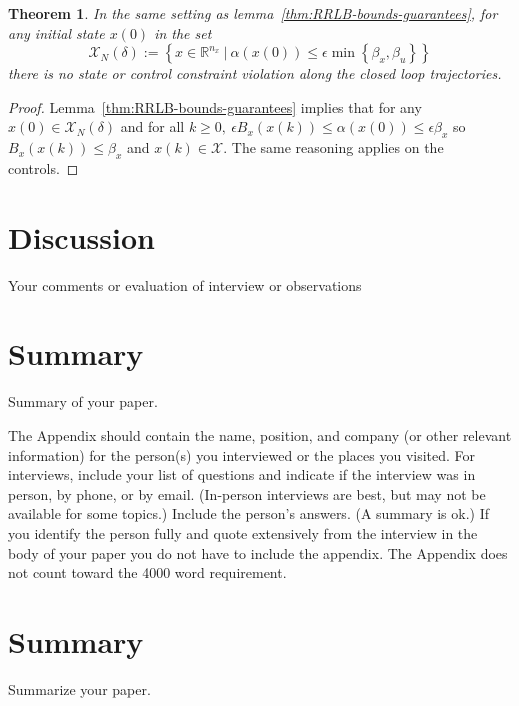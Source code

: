 \documentclass[journal]{IEEEtran}
\newtheorem{theorem}{Theorem}[section]
\theoremstyle{definition}
\theoremstyle{remark}
\def\cal#1{\mathcal{#1}}
\newcommand{\R}{\mathbb{R}}
\begin{document}
\begin{theorem}
	In the same setting as lemma~\ref{thm:RRLB-bounds-guarantees}, for any initial state $x(0)$ in the set
	$$\cal{X}_N(\delta):=\left\{x\in\R^{n_x}~|~\alpha(x(0))\leq\epsilon\min\left\{\beta_x,\beta_u\right\}\right\}$$
	there is no state or control constraint violation along the closed loop trajectories.
\end{theorem}

\begin{proof}
	Lemma~\ref{thm:RRLB-bounds-guarantees} implies that for any $x(0)\in\cal{X}_N(\delta)$ and for all $k\geq 0,~\epsilon B_x(x(k))\leq\alpha(x(0))\leq\epsilon\beta_x$ so $B_x(x(k))\leq \beta_x$ and $x(k)\in\cal{X}$.
	The same reasoning applies on the controls.
\end{proof}

\section{Discussion}
Your comments or evaluation of interview or observations

\section{Summary}
Summary of your paper.

\appendix
The Appendix should contain the name, position, and company (or other relevant information) for the person(s) you interviewed or the places you visited. For interviews, include your list of questions and indicate if the interview was in person, by phone, or by email. (In-person interviews are best, but may not be available for some topics.) Include the person's answers. (A summary is ok.) If you identify the person fully and quote extensively from the interview in the body of your paper you do not have to include the appendix. The Appendix does not count toward the 4000 word requirement.

\section{Summary}
Summarize your paper.

\printbibliography

\end{document}
